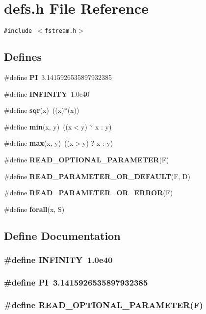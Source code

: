 \section{defs.h File Reference}
\label{defs_h}
{\tt \#include $<$fstream.h$>$}\par
\subsection*{Defines}
\begin{CompactItemize}
\item 
\#define {\bf PI}\ 3.1415926535897932385
\item 
\#define {\bf INFINITY}\ 1.0e40
\item 
\#define {\bf sqr}(x)\ ((x)$\ast$(x))
\item 
\#define {\bf min}(x, y)\ ((x$<$y) ? x : y)
\item 
\#define {\bf max}(x, y)\ ((x$>$y) ? x : y)
\item 
\#define {\bf READ\_\-OPTIONAL\_\-PARAMETER}(F)
\item 
\#define {\bf READ\_\-PARAMETER\_\-OR\_\-DEFAULT}(F, D)
\item 
\#define {\bf READ\_\-PARAMETER\_\-OR\_\-ERROR}(F)
\item 
\#define {\bf forall}(x, S)
\end{CompactItemize}


\subsection{Define Documentation}
\subsubsection{\setlength{\rightskip}{0pt plus 5cm}\#define INFINITY\ 1.0e40}\label{defs_h_a1}


\subsubsection{\setlength{\rightskip}{0pt plus 5cm}\#define PI\ 3.1415926535897932385}\label{defs_h_a0}


\subsubsection{\setlength{\rightskip}{0pt plus 5cm}\#define READ\_\-OPTIONAL\_\-PARAMETER(F)}\label{defs_h_a5}


